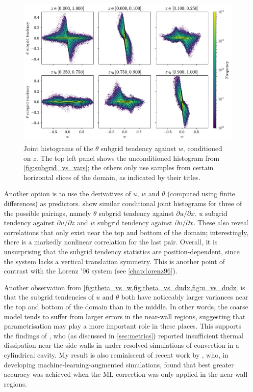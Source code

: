 \documentclass[../main.tex]{subfiles}
\begin{document}
\begin{figure}[ht]
    \centering
    \includegraphics[width=0.9\linewidth]{figures/theta_vs_w.pdf}
    \caption{
        Joint histograms of the $\theta$ subgrid tendency against $w$,
        conditioned on $z$. The top left panel shows the unconditioned
        histogram from \cref{fig:subgrid_vs_vars}; the others only use samples
        from certain horizontal slices of the domain, as indicated by their
        titles.
    }
    \label{fig:theta_vs_w}
\end{figure}

Another option is to use the derivatives of $u$, $w$ and $\theta$ (computed
using finite differences) as predictors.
 show similar conditional joint
histograms for three of the possible pairings, namely $\theta$ subgrid tendency
against $\partial u/\partial x$, $u$ subgrid tendency against $\partial
u/\partial z$ and $w$ subgrid tendency against $\partial u/\partial x$. These
also reveal correlations that only exist near the top and bottom of the domain;
interestingly, there is a markedly nonlinear correlation for the last pair.
Overall, it is unsurprising that the subgrid tendency statistics are
position-dependent, since the system lacks a vertical translation symmetry.
This is another point of contrast with the Lorenz '96 system (see
\cref{chap:lorenz96}).

Another observation from \cref{fig:theta_vs_w,fig:theta_vs_dudx,fig:u_vs_dudz}
is that the subgrid tendencies of $u$ and $\theta$ both have noticeably larger
variances near the top and bottom of the domain than in the middle. In other
words, the coarse model tends to suffer from larger errors in the near-wall
regions, suggesting that parametrisation may play a more important role in
these places. This supports the findings of \textcite{stevens2010}, who (as
discussed in \cref{sec:metrics}) reported insufficient thermal dissipation
near the side walls in under-resolved simulations of \rb{} convection in a
cylindrical cavity. My result is also reminiscent of recent work by
\textcite{alieva2023}, who, in developing machine-learning-augmented \rb{}
simulations, found that best greater accuracy was achieved when the ML
correction was only applied in the near-wall regions.
\end{document}
